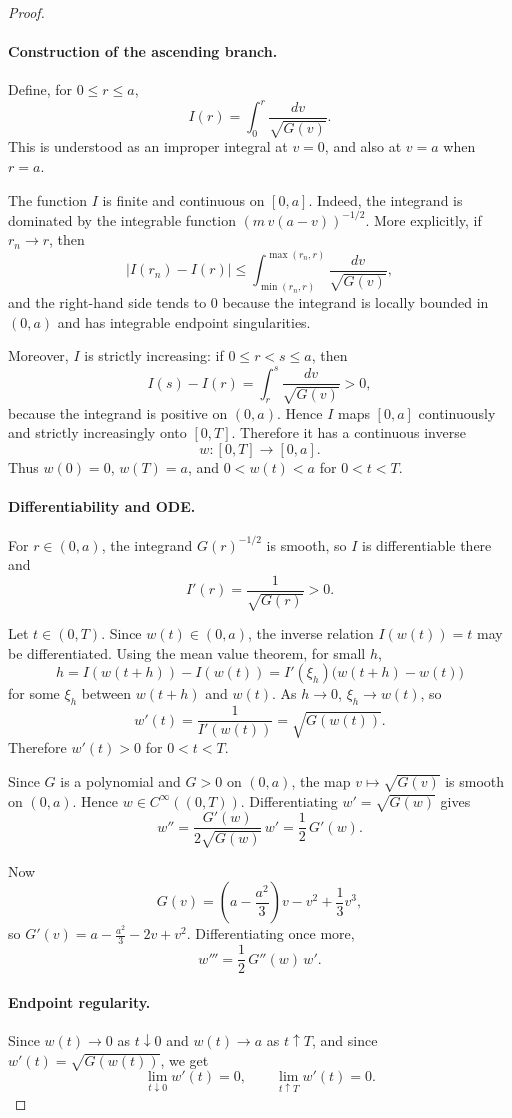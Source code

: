 \begin{proof}
\paragraph{Construction of the ascending branch.}
Define, for $0 \le r \le a$,
\[
I(r) = \int_0^r \frac{dv}{\sqrt{G(v)}}.
\]
This is understood as an improper integral at $v = 0$, and also at $v = a$ when $r = a$.

The function $I$ is finite and continuous on $[0,a]$. Indeed, the integrand is dominated by the integrable function $(m\,v(a-v))^{-1/2}$. More explicitly, if $r_n \to r$, then
\[
|I(r_n) - I(r)| \le \int_{\min(r_n,r)}^{\max(r_n,r)} \frac{dv}{\sqrt{G(v)}},
\]
and the right-hand side tends to $0$ because the integrand is locally bounded in $(0,a)$ and has integrable endpoint singularities.

Moreover, $I$ is strictly increasing: if $0 \le r < s \le a$, then
\[
I(s) - I(r) = \int_r^s \frac{dv}{\sqrt{G(v)}} > 0,
\]
because the integrand is positive on $(0,a)$. Hence $I$ maps $[0,a]$ continuously and strictly increasingly onto $[0,T]$. Therefore it has a continuous inverse
\[
w : [0,T] \to [0,a].
\]
Thus $w(0) = 0$, $w(T) = a$, and $0 < w(t) < a$ for $0 < t < T$.

\paragraph{Differentiability and ODE.}
For $r \in (0,a)$, the integrand $G(r)^{-1/2}$ is smooth, so $I$ is differentiable there and
\[
I'(r) = \frac{1}{\sqrt{G(r)}} > 0.
\]

Let $t \in (0,T)$. Since $w(t) \in (0,a)$, the inverse relation $I(w(t)) = t$ may be differentiated. Using the mean value theorem, for small $h$,
\[
h = I(w(t+h)) - I(w(t)) = I'(\xi_h)\bigl(w(t+h) - w(t)\bigr)
\]
for some $\xi_h$ between $w(t+h)$ and $w(t)$. As $h \to 0$, $\xi_h \to w(t)$, so
\[
w'(t) = \frac{1}{I'(w(t))} = \sqrt{G(w(t))}.
\]
Therefore $w'(t) > 0$ for $0 < t < T$.

Since $G$ is a polynomial and $G > 0$ on $(0,a)$, the map $v \mapsto \sqrt{G(v)}$ is smooth on $(0,a)$. Hence $w \in C^\infty((0,T))$. Differentiating $w' = \sqrt{G(w)}$ gives
\[
w'' = \frac{G'(w)}{2\sqrt{G(w)}}\,w' = \frac{1}{2}\,G'(w).
\]

Now
\[
G(v) = \left(a - \frac{a^2}{3}\right)v - v^2 + \frac{1}{3}v^3,
\]
so $G'(v) = a - \frac{a^2}{3} - 2v + v^2$. Differentiating once more,
\[
w''' = \frac{1}{2}\,G''(w)\,w'.
\]

\paragraph{Endpoint regularity.}
Since $w(t) \to 0$ as $t \downarrow 0$ and $w(t) \to a$ as $t \uparrow T$, and since $w'(t) = \sqrt{G(w(t))}$, we get
\[
\lim_{t \downarrow 0} w'(t) = 0, \qquad \lim_{t \uparrow T} w'(t) = 0.
\]


\end{proof}
